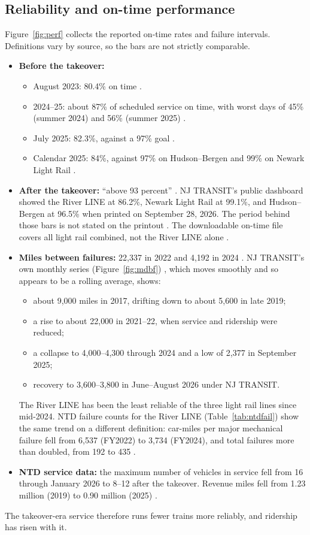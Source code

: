 \documentclass[11pt]{article}
\begin{document}
\subsection{Reliability and on-time performance}
Figure~\ref{fig:perf} collects the reported on-time rates and failure intervals. Definitions vary by source, so the bars are not strictly comparable.
\begin{itemize}
\item \textbf{Before the takeover:}
  \begin{itemize}
  \item August 2023: 80.4\% on time \citep{inquirer2023}.
  \item 2024--25: about 87\% of scheduled service on time, with worst days of 45\% (summer 2024) and 56\% (summer 2025) \citep{ols2027njt}.
  \item July 2025: 82.3\%, against a 97\% goal \citep{news12_2025}.
  \item Calendar 2025: 84\%, against 97\% on Hudson--Bergen and 99\% on Newark Light Rail \citep{njtod2026}.
  \end{itemize}
\item \textbf{After the takeover:} ``above 93 percent'' \citep{ols2027njt}. NJ TRANSIT's public dashboard showed the River LINE at 86.2\%, Newark Light Rail at 99.1\%, and Hudson--Bergen at 96.5\% when printed on September 28, 2026. The period behind those bars is not stated on the printout \citep{njt_otpdash}. The downloadable on-time file covers all light rail combined, not the River LINE alone \citep{njt_otp}.
\item \textbf{Miles between failures:} 22{,}337 in 2022 and 4{,}192 in 2024 \citep{roinj2025}. NJ TRANSIT's own monthly series (Figure~\ref{fig:mdbf}) \citep{njt_mdbf}, which moves smoothly and so appears to be a rolling average, shows:
  \begin{itemize}
  \item about 9{,}000 miles in 2017, drifting down to about 5{,}600 in late 2019;
  \item a rise to about 22{,}000 in 2021--22, when service and ridership were reduced;
  \item a collapse to 4{,}000--4{,}300 through 2024 and a low of 2{,}377 in September 2025;
  \item recovery to 3{,}600--3{,}800 in June--August 2026 under NJ TRANSIT.
  \end{itemize}
  The River LINE has been the least reliable of the three light rail lines since mid-2024. NTD failure counts for the River LINE (Table~\ref{tab:ntdfail}) show the same trend on a different definition: car-miles per major mechanical failure fell from 6{,}537 (FY2022) to 3{,}734 (FY2024), and total failures more than doubled, from 192 to 435 \citep{ntd_breakdowns2224}.
\item \textbf{NTD service data:} the maximum number of vehicles in service fell from 16 through January 2026 to 8--12 after the takeover. Revenue miles fell from 1.23 million (2019) to 0.90 million (2025) \citep{ntd_monthly}.
\end{itemize}
The takeover-era service therefore runs fewer trains more reliably, and ridership has risen with it.
\end{document}
